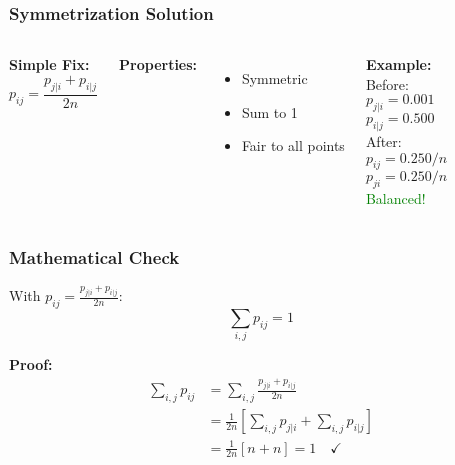 \documentclass[aspectratio=169]{beamer}
\begin{document}
\begin{frame}
\frametitle{Symmetrization Solution}

\begin{columns}
\textbf{Simple Fix:}
$$p_{ij} = \frac{p_{j|i} + p_{i|j}}{2n}$$

\vspace{0.3cm}
\textbf{Properties:}
\begin{itemize}
\item Symmetric
\item Sum to 1
\item Fair to all points
\end{itemize}

\textbf{Example:}\\
Before:\\
$p_{j|i} = 0.001$\\
$p_{i|j} = 0.500$\\[0.3cm]
After:\\
$p_{ij} = 0.250/n$\\
$p_{ji} = 0.250/n$\\[0.3cm]
\textcolor{green}{Balanced!}
\end{columns}

\end{frame}

\begin{frame}
\frametitle{Mathematical Check}

\begin{theorem}
With $p_{ij} = \frac{p_{j|i} + p_{i|j}}{2n}$:
$$\sum_{i,j} p_{ij} = 1$$
\end{theorem}

\textbf{Proof:}
\begin{align*}
\sum_{i,j} p_{ij} &= \sum_{i,j} \frac{p_{j|i} + p_{i|j}}{2n}\\
&= \frac{1}{2n} \left[\sum_{i,j} p_{j|i} + \sum_{i,j} p_{i|j}\right]\\
&= \frac{1}{2n} [n + n] = 1 \quad \checkmark
\end{align*}

\end{frame}
\end{document}
